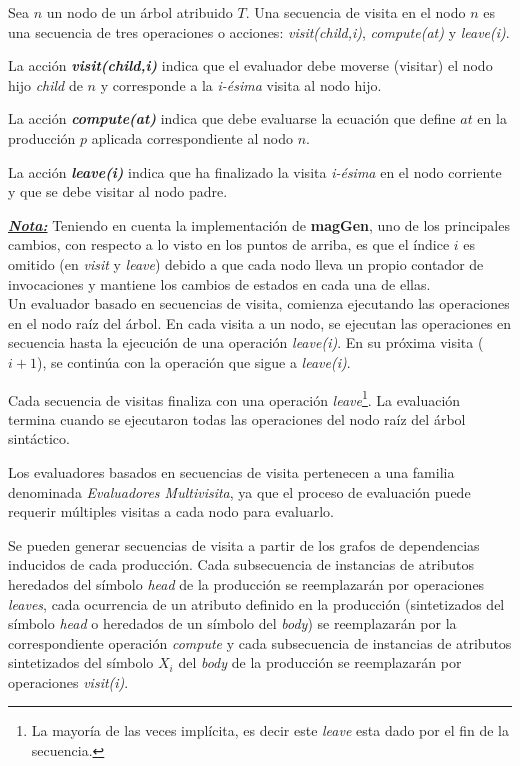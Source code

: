 \documentclass[runningheads,a4paper]{llncs}
\newcommand{\maggen}{\textbf{magGen}}
\begin{document}
Sea $n$ un nodo de un árbol atribuido $T$. 
Una secuencia de visita en el nodo $n$ es una secuencia de tres operaciones o acciones: 
\emph{visit(child,i)}, \emph{compute(at)} y \emph{leave(i)}.

\begin{description}
\item La acción \emph{\textbf{visit(child,i)}} indica que el evaluador debe moverse (visitar) el nodo hijo \emph{child} de $n$ y corresponde a la \emph{i-ésima} visita al nodo hijo.

\item La acción \emph{\textbf{compute(at)}} indica que debe evaluarse la ecuación que define $at$ en la producción $p$ aplicada correspondiente al nodo $n$.

\item La acción \emph{\textbf{leave(i)}} indica que ha finalizado la visita \emph{i-ésima} en el nodo corriente y que se debe visitar al nodo padre.
\end{description}

\underline{\textit{\textbf{Nota:}}}
Teniendo en cuenta la implementación de \maggen, uno de los principales cambios, con respecto a lo visto en los puntos de arriba, es que el índice $i$ es omitido (en \emph{visit} y \emph{leave}) debido a que cada nodo lleva un propio contador de invocaciones y mantiene los cambios de estados en cada una de ellas.\\  

Un evaluador basado en secuencias de visita, comienza ejecutando las operaciones en el nodo raíz del árbol. En cada visita a un nodo, se ejecutan las operaciones en secuencia hasta la ejecución de una operación \emph{leave(i)}. En su próxima visita ($i+1$), se continúa con la operación que sigue a \emph{leave(i)}.

Cada secuencia de visitas finaliza con una operación \emph{leave}\footnote{La mayoría de las veces implícita, es decir este \emph{leave} esta dado por el fin de la secuencia.}. La evaluación termina cuando se ejecutaron todas las operaciones del nodo raíz del árbol sintáctico.

Los evaluadores basados en secuencias de visita pertenecen a una familia denominada \emph{Evaluadores Multivisita}, ya que el proceso de evaluación puede requerir múltiples visitas a cada nodo para evaluarlo.

Se pueden generar secuencias de visita a partir de los grafos de dependencias inducidos de cada producción. Cada subsecuencia de instancias de atributos heredados del símbolo \textit{head} de la producción se reemplazarán por operaciones \emph{leaves}, cada ocurrencia de un atributo definido en la producción (sintetizados del símbolo \textit{head} o heredados de un símbolo del \textit{body}) se reemplazarán por la correspondiente operación \emph{compute} y cada subsecuencia de instancias de atributos sintetizados del símbolo $X_i$ del \textit{body} de la producción se reemplazarán por operaciones \emph{visit(i)}.
\end{document}
